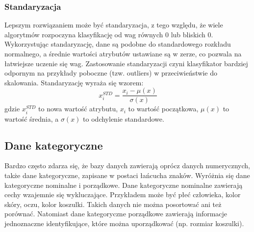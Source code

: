 \subsubsection{Standaryzacja}
Lepszym rozwiązaniem może być standaryzacja, z tego względu, że wiele algorytmów rozpoczyna klasyfikację od wag równych 0 lub bliskich 0. Wykorzystując standaryzację, dane są podobne do standardowego rozkładu normalnego, a średnie wartości atrybutów ustawiane są w zerze, co pozwala na łatwiejsze uczenie się wag. Zastosowanie standaryzacji czyni klasyfikator bardziej odpornym na przykłady poboczne (tzw. outliers) w przeciwieństwie do skalowania. Standaryzację wyraża się wzorem:
\[x_i^{STD} = \frac{x_i - \mu(x)}{\sigma(x)}\]
gdzie $x_i^{STD}$ to nowa wartość atrybutu, $x_i$ to wartość początkowa, $\mu(x)$ to wartość średnia, a $\sigma(x)$ to odchylenie standardowe.
\subsection{Dane kategoryczne}
Bardzo często zdarza się, że bazy danych zawierają oprócz danych numerycznych, także dane kategoryczne, zapisane w postaci łańcucha znaków. Wyróżnia się dane kategoryczne nominalne i porządkowe. Dane kategoryczne nominalne zawierają cechy wzajemnie się wykluczające. Przykładem może być płeć człowieka, kolor skóry, oczu, kolor koszulki. Takich danych nie można posortować ani też porównać. Natomiast dane kategoryczne porządkowe zawierają informacje jednoznaczne identyfikujące, które można uporządkować (np. rozmiar koszulki).
